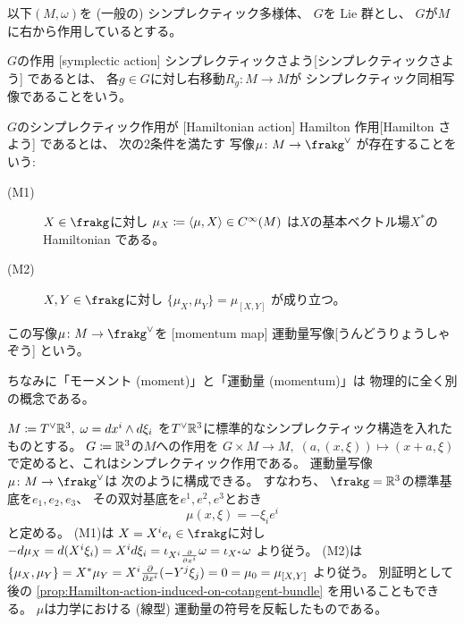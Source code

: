 \documentclass[report,dvipdfmx]{jlreq}
\begin{document}
以下$(M, \omega)$を (一般の) シンプレクティック多様体、
$G$を Lie 群とし、
$G$が$M$に右から{\smooth}作用しているとする。

\begin{definition}[シンプレクティック作用]
    $G$の作用
    [symplectic action]
        {シンプレクティックさよう}[シンプレクティックさよう]
    であるとは、
    各$g \in G$に対し右移動$R_g \colon M \to M$が
    シンプレクティック同相写像であることをいう。
\end{definition}

\begin{definition}[運動量写像]
    $G$のシンプレクティック作用が
    [Hamiltonian action]
        {Hamilton 作用}[Hamilton さよう]
    であるとは、
    次の2条件を満たす
    {\smooth}写像$\mu \colon M \to \frakg^\vee$
    が存在することをいう:
    \begin{description}
        \item[(M1)]
            $X \in \frakg$に対し
            $\mu_X \coloneqq \left\langle{\mu},{X}\right\rangle \in C^\infty(M)$
            は$X$の基本ベクトル場$X^*$の Hamiltonian である。
        \item[(M2)]
            $X, Y \in \frakg$に対し
            $\{\mu_X, \mu_Y\} = \mu_{[X, Y]}$
            が成り立つ。
    \end{description}
    この写像$\mu \colon M \to \frakg^\vee$を
    [momentum map]
        {運動量写像}[うんどうりょうしゃぞう]
    という。
\end{definition}

\begin{remark}
    ちなみに「モーメント (moment)」と「運動量 (momentum)」は
    物理的に全く別の概念である。
\end{remark}

\begin{example}[力学における運動量]
    $M \coloneqq T^\vee \mathbb{R}^3, \;
        \omega = dx^i \wedge d\xi_i$
    を$T^\vee \mathbb{R}^3$に標準的なシンプレクティック構造を入れたものとする。
    $G \coloneqq \mathbb{R}^3$の$M$への作用を
    $G \times M \to M, \;
        (a, (x, \xi)) \mapsto (x + a, \xi)$
    で定めると、これはシンプレクティック作用である。
    運動量写像$\mu \colon M \to \frakg^\vee$は
    次のように構成できる。
    すなわち、
    $\frakg = \R^3$の標準基底を$e_1, e_2, e_3$、
    その双対基底を$e^1, e^2, e^3$とおき
    \begin{equation}
        \mu(x, \xi)
            =
                - \xi_i e^i
    \end{equation}
    と定める。
    (M1)は
    $X = X^i e_i \in \frakg$に対し
    $- d\mu_X
        = d (X^i \xi_i)
        = X^i d\xi_i
        = \iota_{X^i \deldel{x^i}} \omega
        = \iota_{X^*} \omega$
    より従う。
    (M2)は
    $\{ \mu_X, \mu_Y \}
        = X^* \mu_Y
        = X^i \deldel{x^i} (- Y^j \xi_j)
        = 0
        = \mu_0
        = \mu_{[X, Y]}$
    より従う。
    別証明として後の
    \cref{prop:Hamilton-action-induced-on-cotangent-bundle}
    を用いることもできる。
    $\mu$は力学における (線型) 運動量の符号を反転したものである。
\end{example}
\end{document}

